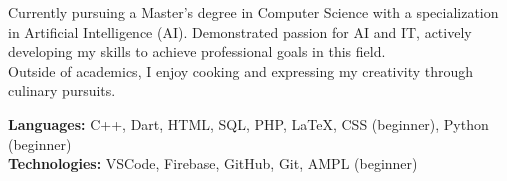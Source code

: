 \documentclass[9pt]{developercv} %
\begin{document}
\vspace{0.5cm}


\begin{minipage}[t]{0.4\textwidth} %
	\vspace{-\baselineskip} %
	Currently pursuing a Master's degree in Computer Science with a specialization in Artificial Intelligence (AI).  Demonstrated passion for AI and IT, actively developing my skills to achieve professional goals in this field. \\
	Outside of academics, I enjoy cooking and expressing my creativity through culinary pursuits.
\end{minipage}
\hfill %
\begin{minipage}[t]{0.5\textwidth} %
	\vspace{-\baselineskip} %
		\textbf{Languages:} C++, Dart, HTML, SQL, PHP, LaTeX, CSS (beginner), Python (beginner) \\

		\textbf{Technologies:} VSCode, Firebase, GitHub, Git, AMPL (beginner)
\end{minipage}

\vspace{0.5cm}



\end{document}
